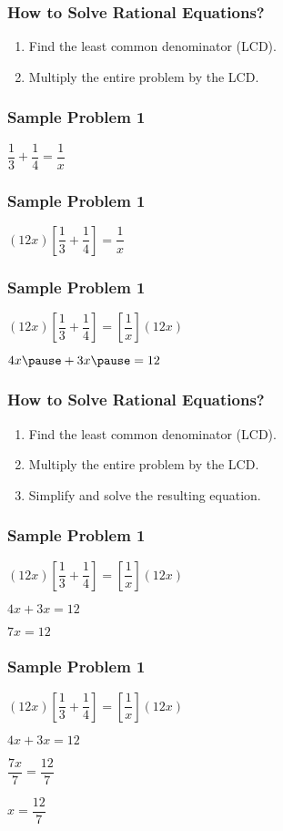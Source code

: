 \documentclass[14pt]{beamer}
\begin{document}
   \begin{frame}
   	\frametitle{How to Solve Rational Equations?}
   	\begin{enumerate}
   		\item Find the least common denominator (LCD).
   		\item Multiply the entire problem by the LCD.
   	\end{enumerate}
   \end{frame}

    \begin{frame}
    	\frametitle{Sample Problem 1}
    	$ \dfrac{1}{3} + \dfrac{1}{4} = \dfrac{1}{x}$
    \end{frame}

    \begin{frame}
    	\frametitle{Sample Problem 1}
    	$ (12x)\left[\dfrac{1}{3} + \dfrac{1}{4} \right] = \dfrac{1}{x} $
    \end{frame}

    \begin{frame}
    	\frametitle{Sample Problem 1}
    	$ (12x)\left[\dfrac{1}{3} + \dfrac{1}{4} \right] = \left[\dfrac{1}{x} \right](12x)$
    	
    	\pause \vspace{1em} $ 4x \pause + 3x \pause = 12 $
    \end{frame}

    \begin{frame}
    	\frametitle{How to Solve Rational Equations?}
    	\begin{enumerate}
    		\item Find the least common denominator (LCD).
    		\item Multiply the entire problem by the LCD.
    		\item Simplify and solve the resulting equation.
    	\end{enumerate}
    \end{frame}

    \begin{frame}
    	\frametitle{Sample Problem 1}
    	$ (12x)\left[\dfrac{1}{3} + \dfrac{1}{4} \right] = \left[\dfrac{1}{x} \right](12x)$
    	
    	 \vspace{1em} $ 4x  + 3x  = 12 $
    	 
    	 \pause \vspace{1em} $ 7x = 12 $
    \end{frame}

    \begin{frame}
    	\frametitle{Sample Problem 1}
    	$ (12x)\left[\dfrac{1}{3} + \dfrac{1}{4} \right] = \left[\dfrac{1}{x} \right](12x)$
    	
    	\vspace{1em} $ 4x  + 3x  = 12 $
    	
    	\vspace{1em} $ \dfrac{7x}{7} = \dfrac{12}{7} $
    	
    	\pause $ x = \dfrac{12}{7} $
    \end{frame}
\end{document}
